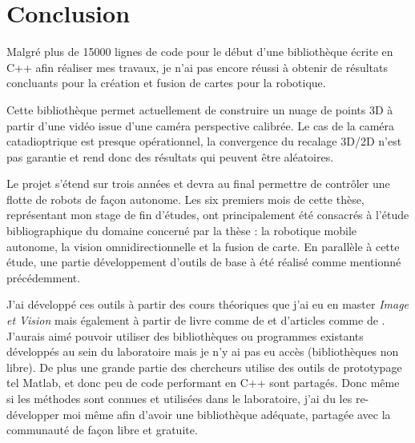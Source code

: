 \section{Conclusion}

Malgré plus de 15000 lignes de code pour le début d'une bibliothèque écrite en C++ afin réaliser mes travaux, je n'ai pas encore réussi à obtenir de résultats concluants pour la création et fusion de cartes pour la robotique.

Cette bibliothèque permet actuellement de construire un nuage de points 3D à partir d'une vidéo issue d'une caméra perspective calibrée.
Le cas de la caméra catadioptrique est presque opérationnel, la convergence du recalage 3D/2D n'est pas garantie et rend donc des résultats qui peuvent être aléatoires.

Le projet s'étend sur trois années et devra au final permettre de contrôler une flotte de robots de façon autonome.
Les six premiers mois de cette thèse, représentant mon stage de fin d'études, ont principalement été consacrés à l'étude bibliographique du domaine concerné par la thèse : la robotique mobile autonome, la vision omnidirectionnelle et la fusion de carte.
En parallèle à cette étude, une partie développement d'outils de base à été réalisé comme mentionné précédemment.

J'ai développé ces outils à partir des cours théoriques que j'ai eu en master \emph{Image et Vision} mais également à partir de livre comme 
de 
\citeauthor{Hartley03Book} 
\cite{Hartley03Book} 
et d'articles comme
de 
\citeauthor{Puig08} 
\cite{Puig08}.
J'aurais aimé pouvoir utiliser des bibliothèques ou programmes existants développés au sein du laboratoire mais je n'y ai pas eu accès (bibliothèques non libre). De plus une grande partie des chercheurs utilise des outils de prototypage tel Matlab, et donc peu de code performant en C++ sont partagés. Donc même si les méthodes sont connues et utilisées dans le laboratoire, j'ai du les re-développer moi même afin d'avoir une bibliothèque adéquate, partagée avec la communauté de façon libre et gratuite.
